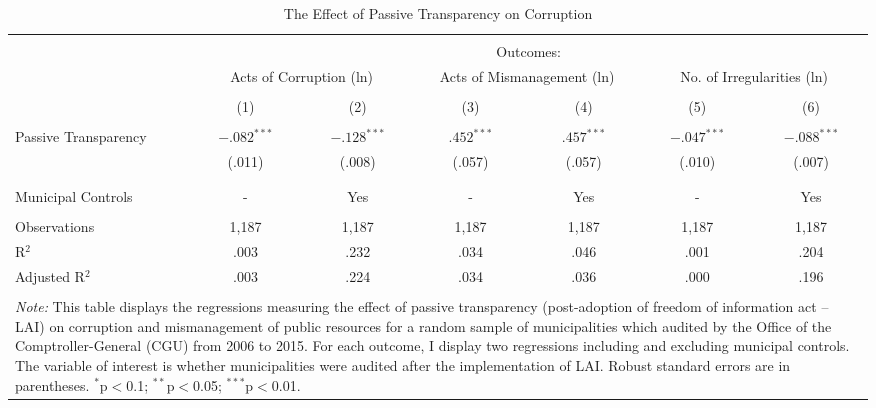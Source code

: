 
\begin{table}[!htbp] \centering
\caption{The Effect of Passive Transparency on Corruption}
\label{tab:corruption1}
\scriptsize
\begin{tabular}{@{\extracolsep{3pt}}lcccccc}
\\[-1.8ex]\hline
\hline \\[-1.8ex]
& \multicolumn{6}{c}{Outcomes:} \T \B \\
\cline{2-7}
& \multicolumn{2}{c}{Acts of Corruption (ln)} & \multicolumn{2}{c}{Acts of Mismanagement (ln)} & \multicolumn{2}{c}{No. of Irregularities (ln)} \T \B \\
\\[-1.8ex] & \multicolumn{1}{c}{(1)} & \multicolumn{1}{c}{(2)} & \multicolumn{1}{c}{(3)} & \multicolumn{1}{c}{(4)} & \multicolumn{1}{c}{(5)} & \multicolumn{1}{c}{(6)} \B\\
\hline \\[-1.8ex]
Passive Transparency & $-.082^{***}$ & $-.128^{***}$ & \hspace{1pt} $.452^{***}$ & \hspace{1pt} $.457^{***}$ & $-.047^{***}$ & $-.088^{***}$ \\
										 & (.011) 		 & (.008) 		 & (.057) 		& (.057) 		 & (.010) 		 & (.007) \\
										 & & & & & & \\
\hline \\[-1.8ex]
Municipal Controls & \multicolumn{1}{c}{-} & \multicolumn{1}{c}{Yes} & \multicolumn{1}{c}{-} & \multicolumn{1}{c}{Yes} & \multicolumn{1}{c}{-} & \multicolumn{1}{c}{Yes} \\
\hline \\[-1.8ex]
Observations & \multicolumn{1}{c}{1,187} & \multicolumn{1}{c}{1,187} & \multicolumn{1}{c}{1,187} & \multicolumn{1}{c}{1,187} & \multicolumn{1}{c}{1,187} & \multicolumn{1}{c}{1,187} \\
R$^{2}$ & \multicolumn{1}{c}{.003} & \multicolumn{1}{c}{.232} & \multicolumn{1}{c}{.034} & \multicolumn{1}{c}{.046} & \multicolumn{1}{c}{.001} & \multicolumn{1}{c}{.204} \\
Adjusted R$^{2}$ & \multicolumn{1}{c}{.003} & \multicolumn{1}{c}{.224} & \multicolumn{1}{c}{.034} & \multicolumn{1}{c}{.036} & \multicolumn{1}{c}{.000} & \multicolumn{1}{c}{.196} \\
\hline
\hline \\[-1.8ex]
\multicolumn{7}{p{.90\textwidth}}{\emph{Note:} This table displays the regressions measuring the effect of passive transparency (post-adoption of freedom of information act -- LAI) on corruption and mismanagement of public resources for a random sample of municipalities which audited by the Office of the Comptroller-General (CGU) from 2006 to 2015. For each outcome, I display two regressions including and excluding municipal controls. The variable of interest is whether municipalities were audited after the implementation of LAI. Robust standard errors are in parentheses. $^{*}$p$<$0.1; $^{**}$p$<$0.05; $^{***}$p$<$0.01.} \\
\end{tabular}
\end{table}
